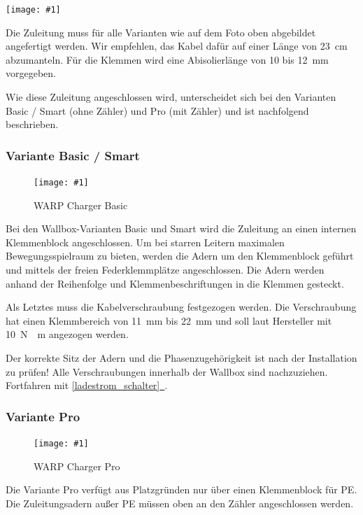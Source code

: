 \documentclass[a4paper,10pt]{article}
\newcommand{\gfx}[1]{\texttt{[image: \#1]}}
\newcommand*{\fullref}[1]{\hyperref[{#1}]{\ref*{#1}~\nameref*{#1}}}
\begin{document}
\begin{multicols*}{2}
	\gfx{./img_warp2/resized/warp_cable_cut_ready}

	Die Zuleitung muss für alle Varianten wie auf dem Foto oben abgebildet
	angefertigt werden. Wir empfehlen, das Kabel dafür auf einer Länge von
	\SI{23}{\centi\meter} abzumanteln. Für die Klemmen wird eine
	Abisolierlänge von 10 bis \SI{12}{\milli\meter} vorgegeben.

	Wie diese Zuleitung angeschlossen wird, unterscheidet sich bei
	den Varianten Basic / Smart (ohne Zähler) und Pro (mit Zähler) und ist
	nachfolgend beschrieben.

	\subsubsection{Variante Basic / Smart}

	\begin{figure}[H]
		\gfx{./img_warp2/resized/warp2_basic_top_open}
		\caption*{WARP Charger Basic}
	\end{figure}

	Bei den Wallbox-Varianten Basic und Smart
	wird die Zuleitung an einen internen Klemmenblock
	angeschlossen. Um bei starren Leitern maximalen Bewegungsspielraum zu bieten,
	werden die Adern um den Klemmenblock geführt und mittels der freien
	Federklemmplätze angeschlossen. Die Adern werden anhand der Reihenfolge und
	Klemmenbeschriftungen in die Klemmen gesteckt.

	Als Letztes muss die Kabelverschraubung festgezogen werden. Die Verschraubung
	hat einen Klemmbereich von \SI{11}{\milli\meter} bis \SI{22}{\milli\meter} und soll laut Hersteller mit
	\SI{10}{\newton{}\meter} angezogen werden.

	Der korrekte Sitz der Adern und die Phasenzugehörigkeit ist nach der
	Installation zu prüfen! Alle Verschraubungen innerhalb der Wallbox sind nachzuziehen.
	Fortfahren mit \fullref{ladestrom_schalter}.


	\subsubsection{Variante Pro}

	\begin{figure}[H]
		\gfx{./img_warp2/resized/warp2_pro_top_open}
		\caption*{WARP Charger Pro}
	\end{figure}

	Die Variante Pro verfügt aus Platzgründen nur über einen Klemmenblock für PE. Die
	Zuleitungsadern außer PE müssen oben an den Zähler angeschlossen werden.


\end{multicols*}
\end{document}
